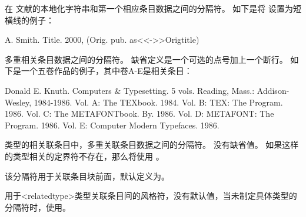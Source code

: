 \begin{ltxsyntax}
\begin{ltxexample}
\mkbibnamelast
\mkbibnamefirst
\mkbibnameaffix
\end{ltxexample}

在  文献的本地化字符串和第一个相应条目数据之间的分隔符。
如下是将  设置为短横线的例子：

\begin{ltxexample}
A. Smith. Title. 2000, (Orig. pub. as<<->>Origtitle)
\end{ltxexample}

多重相关条目数据之间的分隔符。
缺省定义是一个可选的点号加上一个断行。
如下是一个五卷作品的例子，其中卷A-E是相关条目：

\begin{ltxexample}
Donald E. Knuth. Computers & Typesetting. 5 vols. Reading, Mass.: Addison-Wesley, 1984-1986.
Vol. A: The TEXbook. 1984.
Vol. B: TEX: The Program. 1986.
Vol. C: The METAFONTbook. By. 1986.
Vol. D: METAFONT: The Program. 1986.
Vol. E: Computer Modern Typefaces. 1986.
\end{ltxexample}

 类型的相关联条目中，多重关联条目数据之间的分隔符。
没有缺省值。
如果这样的类型相关的定界符不存在，那么将使用 。

该分隔符用于关联条目块前面，默认定义为。

用于<relatedtype>类型关联条目间的风格符，没有默认值，当未制定具体类型的分隔符时，使用。

\end{ltxsyntax}

